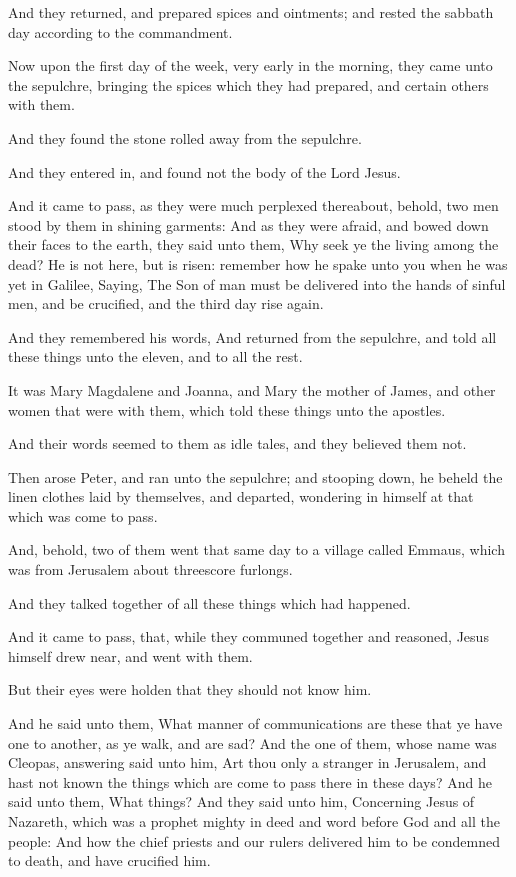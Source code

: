 \Verse And they returned, and prepared spices and ointments; and rested the sabbath day according to the commandment.


\Chapter
\Verse Now upon the first day of the week, very early in the morning, they came unto the sepulchre, bringing the spices which they had prepared, and certain others with them.

\Verse And they found the stone rolled away from the sepulchre.

\Verse And they entered in, and found not the body of the Lord Jesus.

\Verse And it came to pass, as they were much perplexed thereabout, behold, two men stood by them in shining garments: \Verse And as they were afraid, and bowed down their faces to the earth, they said unto them, Why seek ye the living among the dead?  \Verse He is not here, but is risen: remember how he spake unto you when he was yet in Galilee, \Verse Saying, The Son of man must be delivered into the hands of sinful men, and be crucified, and the third day rise again.

\Verse And they remembered his words, \Verse And returned from the sepulchre, and told all these things unto the eleven, and to all the rest.

\Verse It was Mary Magdalene and Joanna, and Mary the mother of James, and other women that were with them, which told these things unto the apostles.

\Verse And their words seemed to them as idle tales, and they believed them not.

\Verse Then arose Peter, and ran unto the sepulchre; and stooping down, he beheld the linen clothes laid by themselves, and departed, wondering in himself at that which was come to pass.

\Verse And, behold, two of them went that same day to a village called Emmaus, which was from Jerusalem about threescore furlongs.

\Verse And they talked together of all these things which had happened.

\Verse And it came to pass, that, while they communed together and reasoned, Jesus himself drew near, and went with them.

\Verse But their eyes were holden that they should not know him.

\Verse And he said unto them, What manner of communications are these that ye have one to another, as ye walk, and are sad?  \Verse And the one of them, whose name was Cleopas, answering said unto him, Art thou only a stranger in Jerusalem, and hast not known the things which are come to pass there in these days?  \Verse And he said unto them, What things? And they said unto him, Concerning Jesus of Nazareth, which was a prophet mighty in deed and word before God and all the people: \Verse And how the chief priests and our rulers delivered him to be condemned to death, and have crucified him.

